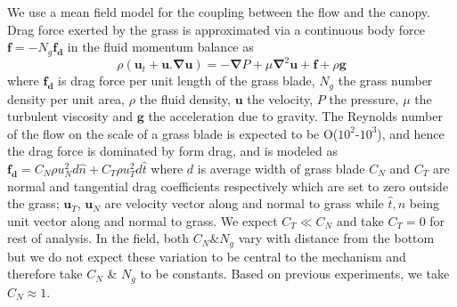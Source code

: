 \documentclass[aps,prl,twocolumn,showpacs,superscriptaddress,groupedaddress,10pt]{revtex4-1}  %
\newcommand{\bu}{\mathbf{u}}
\newcommand{\grad}{\mathbf{\nabla}}
\begin{document}
We use a mean field model for the coupling between the flow and the canopy. Drag force exerted by the grass is approximated via a 
continuous body force $\mathbf{f}=-N_g\mathbf{f_d}$ in the fluid momentum balance\cite{Vivoni98,Nepf99,Ghisal02,Delangre04,Delangre06} as
\begin{equation}
\rho \left(\bu_{t}+\bu.\grad\bu \right) = -\grad P+\mu\grad^{2}\bu +\mathbf{f}+\rho\mathbf{g}
\label{navier-stokes}
\end{equation}
where $\mathbf{f_{d}}$ is drag force per unit length of the grass blade, $N_g$ the grass number density per unit area, $\rho$ the fluid density, $\mathbf{u}$ the velocity, 
$P$ the pressure, $\mu$ the turbulent viscosity and $\mathbf{g}$ the acceleration due to gravity. The Reynolds number of the flow on the scale of a grass blade is expected to 
be O($10^2$-$10^3$), and hence the drag force is dominated by form drag, and is modeled 
as $\mathbf{f_{d}}=C_N \rho u_{N}^{2}d\hat{n}+C_{T}\rho u_{T}^{2}d\hat{t}$ where $d$ is average width of grass blade
$C_{N}$ and $C_{T}$ are normal and tangential drag coefficients respectively which are set to zero outside the grass; $\bu_{T}$, $\bu_{N}$ are velocity vector along and
normal to grass while $\hat{t},\hat{n}$ being unit vector along and normal to grass. We expect $C_T \ll C_N$ and take $C_T=0$ for rest of analysis. In the field, both $C_N \& N_g$ 
vary with distance from the bottom but we do not expect these variation to be central to the mechanism and therefore take $C_N$ \& $N_g$ to be constants. Based on previous experiments\cite{Vivoni98}, we take $C_N \approx 1$.
\end{document}
